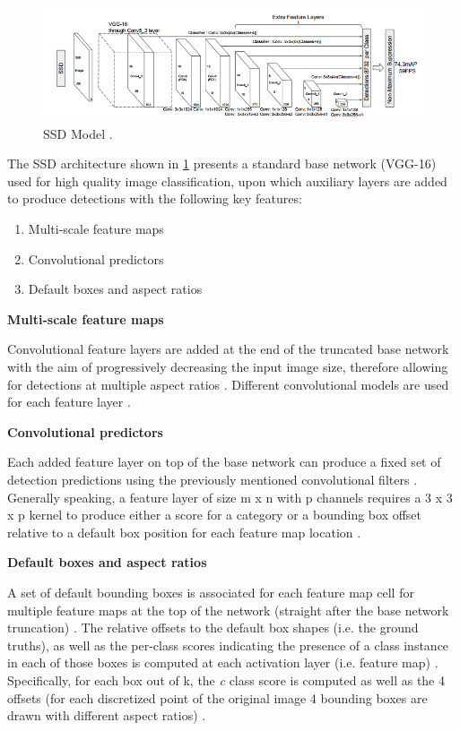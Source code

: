 \begin{figure}[!htbp]
\begin{center}
\includegraphics[width=\linewidth]{images/ssd_architecture.png}
\end{center}
\caption{SSD Model \cite{paper:SSD}.}
\label{fig:sshModel}
\end{figure}

The SSD architecture shown in \ref{fig:sshModel} presents a standard base network (VGG-16) used for high quality image classification, upon which auxiliary layers are added to produce detections with the following key features:

\begin{enumerate}
  \item Multi-scale feature maps
  \item Convolutional predictors
  \item Default boxes and aspect ratios
\end{enumerate}

\textbf{Multi-scale feature maps}

Convolutional feature layers are added at the end of the truncated base network with the aim of progressively decreasing the input image size, therefore allowing for detections at multiple aspect ratios \cite{paper:SSD}. Different convolutional models are used for each feature layer \cite{paper:SSD}.

\textbf{Convolutional predictors}

Each added feature layer on top of the base network can produce a fixed set of detection predictions using the previously mentioned convolutional filters \cite{paper:SSD}. Generally speaking, a feature layer of size m x n with p channels requires a 3 x 3 x p kernel to produce either a score for a category or a bounding box offset relative to a default box position for each feature map location \cite{paper:SSD}.

\textbf{Default boxes and aspect ratios}

A set of default bounding boxes is associated for each feature map cell for multiple feature maps at the top of the network (straight after the base network truncation) \cite{paper:SSD}. The relative offsets to the default box shapes (i.e. the ground truths), as well as the per-class scores indicating the presence of a class instance in each of those boxes is computed at each activation layer (i.e. feature map) \cite{paper:SSD}. Specifically, for each box out of k, the \textit{c} class score is computed as well as the 4 offsets (for each discretized point of the original image 4 bounding boxes are drawn with different aspect ratios)  \cite{paper:SSD}.


